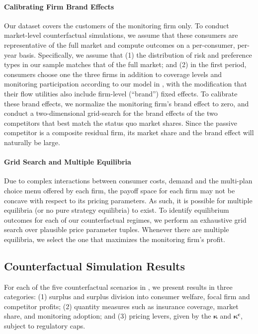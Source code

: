 \paragraph{Calibrating Firm Brand Effects}
Our dataset covers the customers of the monitoring firm only. To conduct market-level counterfactual simulations, we assume that these consumers are representative of the full market and compute outcomes on a per-consumer, per-year basis. Specifically, we assume that
(1) the distribution of risk and preference types in our sample matches that of the full market; and (2) in the first period, consumers choose one the three firms in addition to coverage levels and monitoring participation according to our model in , with the modification that their flow utilities also include firm-level (``brand'') fixed effects. To calibrate these brand effects, we normalize the monitoring firm's brand effect to zero, and conduct a two-dimensional grid-search for the brand effects of the two competitors that best match the status quo market shares. Since the passive competitor is a composite residual firm, its market share and the brand effect will naturally be large.

\paragraph{Grid Search and Multiple Equilibria}
Due to complex interactions between consumer costs, demand and the multi-plan choice menu offered by each firm, the payoff space for each firm may not be concave with respect to its pricing parameters. As such, it is possible for multiple equilibria (or no pure strategy equilibria) to exist. To identify equilibrium outcomes for each of our counterfactual regimes, we perform an exhaustive grid search over plausible price parameter tuples.
Whenever there are multiple equilibria, we select the one that maximizes the monitoring firm's profit.

\subsection{Counterfactual Simulation Results}

For each of the five counterfactual scenarios in , we present results in three categories: (1) surplus and surplus division into consumer welfare, focal firm and competitor profits; (2) quantity measures such as insurance coverage, market share, and monitoring adoption; and (3) pricing levers, given by the $\boldsymbol{\kappa}$ and $\boldsymbol{\kappa^c}$, subject to regulatory caps.

